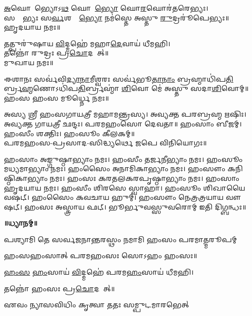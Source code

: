 \ul{𑌅}𑌘𑍋𑌰𑍇᳚𑌭𑍍𑌯𑍋𑌽\ul{𑌥} 𑌘𑍋𑌰𑍇᳚\ul{𑌭𑍍𑌯𑍋} 𑌘𑍋\ul{𑌰}𑌘𑍋𑌰॑𑌤𑌰𑍇𑌭𑍍𑌯𑌃।\\
𑌸𑌰𑍍𑌵𑍇᳚𑌭𑍍𑌯𑌃 𑌸\ul{𑌰𑍍𑌵}𑌶𑌰𑍍𑌵𑍇᳚\ul{𑌭𑍍𑌯𑍋} 𑌨𑌮॑𑌸𑍍𑌤𑍇 𑌅𑌸𑍍𑌤𑍁 \ul{𑌰𑍁}𑌦𑍍𑌰𑌰𑍂॑𑌪𑍇𑌭𑍍𑌯𑌃॥\\
𑌹𑍃𑌦𑌯𑌾𑌯 𑌨𑌮𑌃॥ 

𑌤𑌤𑍍𑌪𑍁𑌰𑍁॑𑌷𑌾𑌯 \ul{𑌵𑌿}𑌦𑍍𑌮𑌹𑍇॑ 𑌮𑌹𑌾\ul{𑌦𑍇}𑌵𑌾𑌯॑ 𑌧𑍀𑌮𑌹𑌿।\\
𑌤𑌨𑍍𑌨𑍋॑ 𑌰𑍁𑌦𑍍𑌰𑌃 𑌪𑍍𑌰\ul{𑌚𑍋}𑌦𑌯𑌾᳚𑌤𑍍॥\\
𑌮𑍁𑌖𑌾𑌯 𑌨𑌮𑌃॥ 

𑌈𑌶𑌾𑌨𑌃 𑌸𑌰𑍍𑌵॑𑌵𑌿\ul{𑌦𑍍𑌯𑌾}\ul{𑌨𑌾}𑌮𑍀𑌶𑍍𑌵𑌰𑌃 𑌸𑌰𑍍𑌵॑𑌭𑍂\ul{𑌤𑌾}\ul{𑌨𑌾𑌂} 𑌬𑍍𑌰𑌹𑍍𑌮𑌾𑌧𑌿॑𑌪\ul{𑌤𑌿}𑌰𑍍𑌬𑍍𑌰\ul{𑌹𑍍𑌮}𑌣𑍋\-𑌽𑌧𑌿॑𑌪\ul{𑌤𑌿}𑌰𑍍𑌬𑍍𑌰𑌹𑍍𑌮𑌾॑ \ul{𑌶𑌿}𑌵𑍋 𑌮𑍇॑ 𑌅𑌸𑍍𑌤𑍁 𑌸𑌦𑌾\ul{𑌶𑌿}𑌵𑍋𑌮𑍍॥\\
𑌹𑌂𑌸 𑌹𑌂𑌸 𑌮𑍂𑌰𑍍𑌧𑍍𑌨𑍇 𑌨𑌮𑌃॥ \\
{\small \closesection}

𑌅𑌸𑍍𑌯 𑌶𑍍𑌰𑍀 𑌹𑌂𑌸𑌗𑌾𑌯𑌤𑍍𑌰𑍀 𑌮𑌹𑌾𑌮𑌨𑍍𑌤𑍍𑌰𑌸𑍍𑌯। 𑌅𑌵𑍍𑌯𑌕𑍍𑌤 𑌪𑌰𑌬𑍍𑌰𑌹𑍍𑌮 𑌋𑌷𑌿𑌃। 𑌅𑌵𑍍𑌯𑌕𑍍𑌤 𑌗𑌾𑌯𑌤𑍍𑌰𑍀 𑌛𑌨𑍍𑌦𑌃। 𑌪𑌰𑌮𑌹𑌂𑌸𑍋 𑌦𑍇𑌵𑌤𑌾॥ 𑌹𑌂𑌸𑌾𑌂 𑌬𑍀𑌜𑌮𑍍। 𑌹𑌂𑌸𑍀𑌂 𑌶𑌕𑍍𑌤𑌿𑌃। 𑌹𑌂𑌸𑍂𑌂 𑌕𑍀𑌲𑌕𑌮𑍍॥\\
𑌪𑌰𑌮𑌹𑌂𑌸-𑌪𑍍𑌰𑌸𑌾𑌦-𑌸𑌿𑌦𑍍𑌧𑍍𑌯𑌰𑍍𑌥𑍇 𑌜𑌪𑍇 𑌵𑌿𑌨𑌿𑌯𑍋𑌗𑌃॥

𑌹𑌂𑌸𑌾𑌂 𑌅𑌙𑍍𑌗𑍁𑌷𑍍𑌠𑌾𑌭𑍍𑌯𑌾𑌂 𑌨𑌮𑌃।
𑌹𑌂𑌸𑍀𑌂 𑌤𑌰𑍍𑌜𑌨𑍀𑌭𑍍𑌯𑌾𑌂 𑌨𑌮𑌃।
𑌹𑌂𑌸𑍂𑌂 𑌮𑌧𑍍𑌯𑌮𑌾𑌭𑍍𑌯𑌾𑌂 𑌨𑌮𑌃।
𑌹𑌂𑌸𑍈𑌂 𑌅𑌨𑌾𑌮𑌿𑌕𑌾𑌭𑍍𑌯𑌾𑌂 𑌨𑌮𑌃।
𑌹𑌂𑌸𑍗𑌂 𑌕𑌨𑌿𑌷𑍍𑌠𑌿𑌕𑌾𑌭𑍍𑌯𑌾𑌂 𑌨𑌮𑌃।
𑌹𑌂𑌸𑌃 𑌕𑌰𑌤𑌲𑌕𑌰𑌪𑍃𑌷𑍍𑌠𑌾𑌭𑍍𑌯𑌾𑌂 𑌨𑌮𑌃।
𑌹𑌂𑌸𑌾𑌂 𑌹𑍃𑌦𑌯𑌾𑌯 𑌨𑌮𑌃।
𑌹𑌂𑌸𑍀𑌂 𑌶𑌿𑌰𑌸𑍇 𑌸𑍍𑌵𑌾𑌹𑌾।
𑌹𑌂𑌸𑍂𑌂 𑌶𑌿𑌖𑌾𑌯𑍈 𑌵𑌷𑌟𑍍।
𑌹𑌂𑌸𑍈𑌂 𑌕𑌵𑌚𑌾𑌯 𑌹𑍁𑌮𑍍।
𑌹𑌂𑌸𑍗𑌂 𑌨𑍇𑌤𑍍𑌰𑌤𑍍𑌰𑌯𑌾𑌯 𑌵𑍗𑌷𑌟𑍍।
𑌹𑌂𑌸𑌃 𑌅𑌸𑍍𑌤𑍍𑌰𑌾𑌯 𑌫𑌟𑍍।
𑌭𑍂𑌰𑍍𑌭𑍁𑌵𑌸𑍍𑌸𑍁𑌵𑌰𑍋𑌮𑍍 𑌇𑌤𑌿 𑌦𑌿𑌗𑍍𑌬𑌨𑍍𑌧𑌃॥

\centerline{\textbf{॥𑌧𑍍𑌯𑌾𑌨𑌮𑍍॥}}
{𑌪𑌶𑍍𑌯𑌾𑌮𑌿 𑌤𑍇 𑌸𑌰𑍍𑌵𑌜𑌨𑌾𑌨𑍍𑌤𑌰𑌸𑍍𑌥𑌂 𑌨𑌮𑌾𑌮𑌿 𑌹𑌂𑌸𑌂 𑌪𑌰𑌮𑌾𑌤𑍍𑌮𑌰𑍂𑌪𑌮𑍍}
\smallskip
\centerline{𑌹𑌂𑌸𑌹𑌂𑌸𑌾𑌤𑍍 𑌪𑌰𑌮𑌹𑌂𑌸𑌃 𑌸𑍋𑌽𑌹𑌂 𑌹𑌂𑌸𑌃॥}
\smallskip
\centerline{\ul{𑌹𑌂}\ul{𑌸} \ul{𑌹𑌂}𑌸𑌾𑌯॑ \ul{𑌵𑌿}𑌦𑍍𑌮𑌹𑍇॑ 𑌪𑌰𑌮\ul{𑌹𑌂}𑌸𑌾𑌯॑ 𑌧𑍀𑌮𑌹𑌿।}
\centerline{𑌤𑌨𑍍𑌨𑍋॑ 𑌹𑌂𑌸𑌃 𑌪𑍍𑌰\ul{𑌚𑍋}𑌦𑌯𑌾᳚𑌤𑍍॥ } 
\begin{flushright}
\vspace{-5.7ex}{\small (𑌏𑌵𑌂 𑌤𑍍𑌰𑌿𑌃)}
\end{flushright}

{𑌏𑌵𑌂 𑌨𑍍𑌯𑌾𑌸𑌵𑌿𑌧𑌿𑌂 𑌕𑍃𑌤𑍍𑌵𑌾 𑌤𑌤𑌃 𑌸𑌮𑍍𑌪𑍁𑌟𑌮𑌾𑌰𑌭𑍇𑌤𑍍}

{\small \closesection}

\newcommand{\indradi}[9]{\refstepcounter{dik}
𑍐 𑌭𑍂𑌰𑍍𑌭𑍁\ul{𑌵𑌃} 𑌸𑍁\ul{𑌵}𑌰𑍋𑌮𑍍।\\
\lbrack#1\rbrack\  #2। #5।\\#6॥\\%
#2 𑌭𑍂𑌰𑍍𑌭𑍁\ul{𑌵𑌃} 𑌸𑍁𑌵𑌃॑। #4 #7 𑌸𑌾𑌙𑍍𑌗𑌾𑌯 𑌸𑌾𑌯𑍁𑌧𑌾𑌯 𑌸𑌶𑌕𑍍𑌤𑌿𑌪𑌰𑌿𑌵𑌾𑌰𑌾𑌯 𑌸𑌰𑍍𑌵𑌾𑌲𑌙𑍍𑌕𑌾𑌰\-𑌭𑍂𑌷𑌿𑌤𑌾𑌯 𑌉𑌮𑌾𑌮𑌹𑍇𑌶𑍍𑌵𑌰\-𑌪𑌾𑌰𑍍𑌷𑌦𑌾𑌯 𑌨𑌮𑌃।\\%
#8𑌦𑌿𑌗𑍍𑌭𑌾𑌗𑍇 #9 #2 #4 𑌨𑌮𑌃। #3 𑌸𑍁𑌪𑍍𑌰𑍀𑌤𑍋 𑌵𑌰𑌦𑍋 𑌭𑌵𑌤𑍁॥ \lbrack#3 𑌸𑌂𑌰𑌕𑍍𑌷𑌤𑍁॥\rbrack\hfill॥\devanumber{\arabic{dik}}॥}

